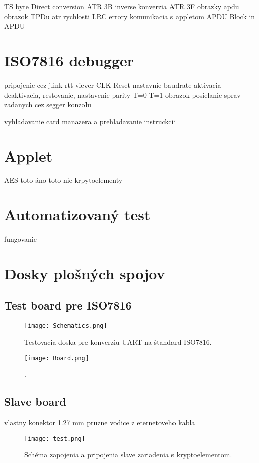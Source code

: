 \documentclass[12pt,a4wide,oneside,openright]{report}
\begin{document}
TS byte Direct conversion ATR 3B
inverse konverzia ATR 3F
obrazky apdu
obrazok TPDu
atr
rychlosti
LRC
errory
komunikacia s appletom
APDU Block in APDU

\section{ISO7816 debugger}
pripojenie
cez jlink rtt viever
	CLK
	Reset
nastavnie baudrate
aktivacia deaktivacia, restovanie,
nastavenie parity
T=0 T=1
obrazok
posielanie sprav zadanych cez segger konzolu

vyhladavanie card manazera  a prehladavanie instruckcii

\section{Applet}
AES
toto áno
toto nie
krpytoelementy

\section{Automatizovaný test}
fungovanie

\section{Dosky plošných spojov}
\subsection{Test board pre ISO7816}

\begin{figure*}[h]
	\centering
	\texttt{[image: Schematics.png]}
	\caption{Testovacia doska pre konverziu UART na štandard ISO7816.}
	\label{f:board_ISO_schematic}
\end{figure*}

\begin{figure*}[h]
	\centering
	\texttt{[image: Board.png]}
	\caption{.}
	\label{f:board_ISO_layout}
\end{figure*}

\subsection{Slave board}

vlastny konektor 
1.27 mm
pruzne
vodice z eternetoveho kabla

\begin{figure*}[h]
	\centering
	\texttt{[image: test.png]}
	\caption{Schéma zapojenia a pripojenia slave zariadenia s kryptoelementom.}
	\label{f:board_slave_schematic}
\end{figure*}
\end{document}
